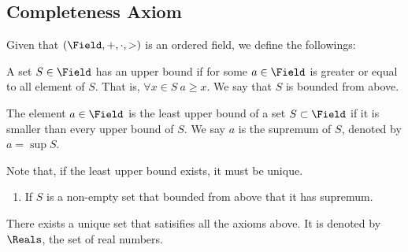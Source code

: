 \subsection{Completeness Axiom}
Given that \((\Field, + ,\cdot , >)\) is an ordered field, we define the followings:
\begin{definition} 
    A set \(S \in \Field\) has an upper bound if for some \(a \in \Field\) is greater or equal to all element of \(S\). That is, \(\forall x \in S\: a \geq x\). We say that \(S\) is bounded from above.
\end{definition}
\begin{definition} 
   The element \(a \in \Field\) is the least upper bound of a set \(S \subset \Field\) if it is smaller than every upper bound of \(S\). We say \(a\) is the supremum of \(S\), denoted by \(a = \sup{S}\).
\end{definition}
Note that, if the least upper bound exists, it must be unique.
\begin{enumerate}[wide,resume,label={Axiom \arabic*.}]
    \item If \(S\) is a non-empty set that bounded from above that it has supremum.
\end{enumerate}
\begin{theorem}
    There exists a unique set that satisifies all the axioms above. It is denoted by \(\Reals\), the set of real numbers.
\end{theorem}
